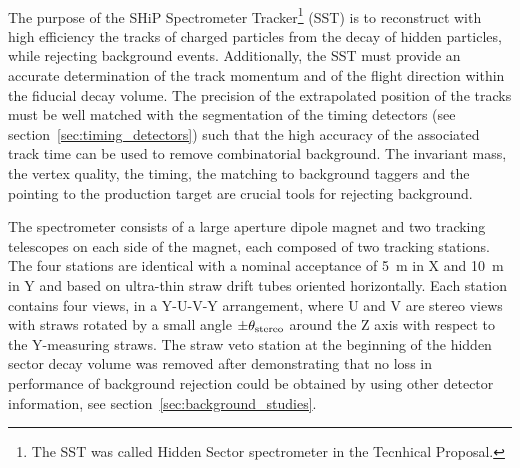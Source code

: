 \\
\noindent
The purpose of the SHiP Spectrometer Tracker\footnote{%
   The SST was called Hidden Sector spectrometer in the Tecnhical Proposal.
   }
(SST) 
is to reconstruct with high efficiency the tracks
of charged particles from the decay of hidden particles, while rejecting background events.
Additionally, the SST must provide an accurate determination of the track
momentum and of the flight direction within the fiducial decay volume.
The precision of the extrapolated position of the tracks must be well matched with the
segmentation of the timing detectors (see section~\ref{sec:timing_detectors}) such that
the high accuracy of the associated track time can be used to remove combinatorial background.
The invariant mass, the vertex quality, the timing, the matching to background taggers
and the pointing to the production target are crucial tools for rejecting background. 

The spectrometer consists of a large aperture dipole magnet  
and two tracking telescopes on each side of the magnet, 
each composed of two tracking stations. 
The four stations are identical with a nominal acceptance of 5~m in X and 10~m in Y
and based on ultra-thin straw drift tubes oriented horizontally.
Each station contains four views, in a Y-U-V-Y arrangement, where U and V are stereo views
with straws rotated by a small angle $\pm\theta_{\rm stereo}$ around the Z axis with respect to
the Y-measuring straws.
The straw veto station at the beginning of the hidden sector decay volume was removed
after demonstrating that no loss in performance of background rejection could be obtained by using 
other detector information, see section~\ref{sec:background_studies}.

